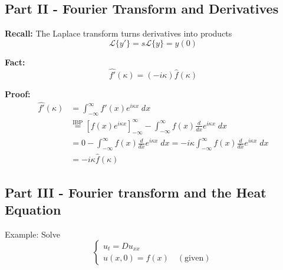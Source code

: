 \documentclass[12pt]{article}
\renewcommand{\L}[1]{\mathcal{L}\{#1\}}
\newcommand{\ans}[1]{\boxed{\text{#1}}}
\renewcommand{\hat}[1]{\widehat{#1}}
\begin{document}
\subsection*{Part II - Fourier Transform and Derivatives}
\textbf{Recall:} The Laplace transform turns derivatives into products
\[\L{y'} = s\L{y} = y(0)\]

\textbf{Fact:}
\[\ans{$\hat{f'}(\kappa) = (-i\kappa)\hat{f}(\kappa)$}\]

\textbf{Proof:}
\begin{align*}
    \hat{f'}(\kappa) &= \int_{-\infty}^{\infty} f'(x) e^{i\kappa x}\; dx\\
    &\overset{\text{IBP}}{=} \left[f(x)e^{i\kappa x}\right]_{-\infty}^\infty - \int_{-\infty}^\infty f(x) \frac{d}{dx}e^{i\kappa x}\; dx\\
    &= 0 - \int_{-\infty}^\infty f(x) \frac{d}{dx}e^{i\kappa x} \; dx= -i\kappa \int_{-\infty}^\infty f(x) \frac{d}{dx}e^{i\kappa x}\; dx\\
    &= -i\kappa \hat{f}(\kappa)
\end{align*}

\subsection*{Part III - Fourier transform and the Heat Equation}
Example: Solve 
\[\begin{cases}
    u_t = Du_{xx}\\
    u(x, 0) = f(x) \quad (\text{given})
\end{cases}\]
\end{document}
